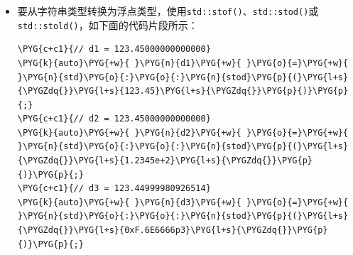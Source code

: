 \begin{itemize}
\begin{codeblockbg}
\begin{Verbatim}[commandchars=\\\{\},breaklines=true,breakanywhere=true,fontsize=\codefont,xleftmargin=17bp]
\PYG{k}{auto}\PYG{+w}{ }\PYG{n}{i1}\PYG{+w}{ }\PYG{o}{=}\PYG{+w}{ }\PYG{n}{std}\PYG{o}{:}\PYG{o}{:}\PYG{n}{stoi}\PYG{p}{(}\PYG{l+s}{\PYGZdq{}}\PYG{l+s}{42}\PYG{l+s}{\PYGZdq{}}\PYG{p}{)}\PYG{p}{;}\PYG{+w}{                 }\PYG{c+c1}{// i1 = 42}
\PYG{k}{auto}\PYG{+w}{ }\PYG{n}{i2}\PYG{+w}{ }\PYG{o}{=}\PYG{+w}{ }\PYG{n}{std}\PYG{o}{:}\PYG{o}{:}\PYG{n}{stoi}\PYG{p}{(}\PYG{l+s}{\PYGZdq{}}\PYG{l+s}{101010}\PYG{l+s}{\PYGZdq{}}\PYG{p}{,}\PYG{+w}{ }\PYG{n+nb}{nullptr}\PYG{p}{,}\PYG{+w}{ }\PYG{l+m+mi}{2}\PYG{p}{)}\PYG{p}{;}\PYG{+w}{ }\PYG{c+c1}{// i2 = 42}
\PYG{k}{auto}\PYG{+w}{ }\PYG{n}{i3}\PYG{+w}{ }\PYG{o}{=}\PYG{+w}{ }\PYG{n}{std}\PYG{o}{:}\PYG{o}{:}\PYG{n}{stoi}\PYG{p}{(}\PYG{l+s}{\PYGZdq{}}\PYG{l+s}{052}\PYG{l+s}{\PYGZdq{}}\PYG{p}{,}\PYG{+w}{ }\PYG{n+nb}{nullptr}\PYG{p}{,}\PYG{+w}{ }\PYG{l+m+mi}{8}\PYG{p}{)}\PYG{p}{;}\PYG{+w}{    }\PYG{c+c1}{// i3 = 42}
\PYG{k}{auto}\PYG{+w}{ }\PYG{n}{i4}\PYG{+w}{ }\PYG{o}{=}\PYG{+w}{ }\PYG{n}{std}\PYG{o}{:}\PYG{o}{:}\PYG{n}{stoi}\PYG{p}{(}\PYG{l+s}{\PYGZdq{}}\PYG{l+s}{0x2A}\PYG{l+s}{\PYGZdq{}}\PYG{p}{,}\PYG{+w}{ }\PYG{n+nb}{nullptr}\PYG{p}{,}\PYG{+w}{ }\PYG{l+m+mi}{16}\PYG{p}{)}\PYG{p}{;}\PYG{+w}{  }\PYG{c+c1}{// i4 = 42}
\end{Verbatim}
\end{codeblockbg}



\item 要从字符串类型转换为浮点类型，使用\texttt{std::\allowbreak{}stof()}、\texttt{std::\allowbreak{}stod()}或\texttt{std::\allowbreak{}stold()}，如下面的代码片段所示：



\begin{codeblockbg}
\begin{Verbatim}[commandchars=\\\{\},breaklines=true,breakanywhere=true,fontsize=\codefont,xleftmargin=17bp]
\PYG{c+c1}{// d1 = 123.45000000000000}
\PYG{k}{auto}\PYG{+w}{ }\PYG{n}{d1}\PYG{+w}{ }\PYG{o}{=}\PYG{+w}{ }\PYG{n}{std}\PYG{o}{:}\PYG{o}{:}\PYG{n}{stod}\PYG{p}{(}\PYG{l+s}{\PYGZdq{}}\PYG{l+s}{123.45}\PYG{l+s}{\PYGZdq{}}\PYG{p}{)}\PYG{p}{;}
\PYG{c+c1}{// d2 = 123.45000000000000}
\PYG{k}{auto}\PYG{+w}{ }\PYG{n}{d2}\PYG{+w}{ }\PYG{o}{=}\PYG{+w}{ }\PYG{n}{std}\PYG{o}{:}\PYG{o}{:}\PYG{n}{stod}\PYG{p}{(}\PYG{l+s}{\PYGZdq{}}\PYG{l+s}{1.2345e+2}\PYG{l+s}{\PYGZdq{}}\PYG{p}{)}\PYG{p}{;}
\PYG{c+c1}{// d3 = 123.44999980926514}
\PYG{k}{auto}\PYG{+w}{ }\PYG{n}{d3}\PYG{+w}{ }\PYG{o}{=}\PYG{+w}{ }\PYG{n}{std}\PYG{o}{:}\PYG{o}{:}\PYG{n}{stod}\PYG{p}{(}\PYG{l+s}{\PYGZdq{}}\PYG{l+s}{0xF.6E6666p3}\PYG{l+s}{\PYGZdq{}}\PYG{p}{)}\PYG{p}{;}
\end{Verbatim}
\end{codeblockbg}

\end{itemize}


